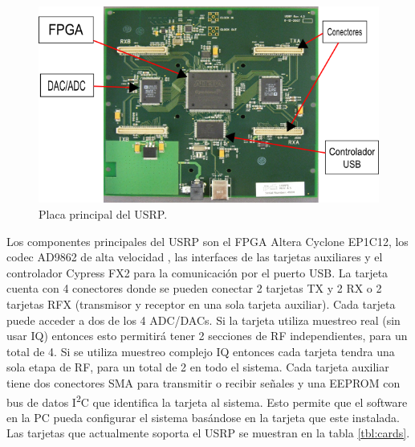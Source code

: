 \begin{figure}[t]
\centering
	\includegraphics[width=5.5in]{figs/usrp}
	\vspace{0.3in}
	\caption{Placa principal del USRP.}
	\label{fig:sisusrp}
\end{figure}

Los componentes principales del USRP son el FPGA Altera Cyclone EP1C12, los codec AD9862 de alta
velocidad , las interfaces de las tarjetas auxiliares y el controlador Cypress FX2 para la
comunicaci\'on por el puerto USB. La tarjeta cuenta con 4 conectores donde se pueden conectar 2
tarjetas TX y 2 RX o 2 tarjetas RFX (transmisor y receptor en una sola tarjeta auxiliar). Cada
tarjeta puede acceder a dos de los 4 ADC/DACs. Si la tarjeta utiliza muestreo real (sin usar IQ)
entonces esto permitir\'a tener 2 secciones de RF independientes, para un total de 4. Si se utiliza
muestreo complejo IQ entonces cada tarjeta tendra una sola etapa de RF, para un total de 2 en todo
el sistema. Cada tarjeta auxiliar tiene dos conectores SMA para transmitir o recibir se\~nales y una
EEPROM con bus de datos I\textsuperscript{2}C que identifica la tarjeta al sistema. Esto permite que el software en la
PC pueda configurar el sistema bas\'andose en la tarjeta que este instalada. Las tarjetas que
actualmente soporta el USRP se muestran en la tabla \ref{tbl:cards}.

